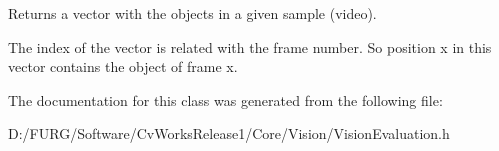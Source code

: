 Returns a vector with the objects in a given sample (video). 

The index of the vector is related with the frame number. So position x in this vector contains the object of frame x. 

The documentation for this class was generated from the following file\+:\begin{DoxyCompactItemize}
\item 
D\+:/\+F\+U\+R\+G/\+Software/\+Cv\+Works\+Release1/\+Core/\+Vision/Vision\+Evaluation.\+h\end{DoxyCompactItemize}
